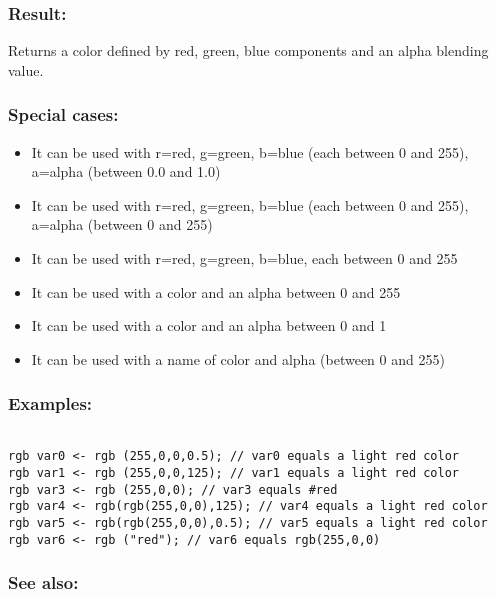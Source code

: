 \documentclass[]{book}
\providecommand{\tightlist}{%
  \setlength{\itemsep}{0pt}\setlength{\parskip}{0pt}}
\theoremstyle{definition}
\theoremstyle{definition}
\theoremstyle{definition}
\theoremstyle{remark}
\begin{document}
\subsubsection{Result:}\label{result-423}

Returns a color defined by red, green, blue components and an alpha
blending value.

\subsubsection{Special cases:}\label{special-cases-118}

\begin{itemize}
\tightlist
\item
  It can be used with r=red, g=green, b=blue (each between 0 and 255),
  a=alpha (between 0.0 and 1.0)\\
\item
  It can be used with r=red, g=green, b=blue (each between 0 and 255),
  a=alpha (between 0 and 255)\\
\item
  It can be used with r=red, g=green, b=blue, each between 0 and 255\\
\item
  It can be used with a color and an alpha between 0 and 255\\
\item
  It can be used with a color and an alpha between 0 and 1\\
\item
  It can be used with a name of color and alpha (between 0 and 255)
\end{itemize}

\subsubsection{Examples:}\label{examples-300}

\begin{verbatim}
 
rgb var0 <- rgb (255,0,0,0.5); // var0 equals a light red color 
rgb var1 <- rgb (255,0,0,125); // var1 equals a light red color 
rgb var3 <- rgb (255,0,0); // var3 equals #red 
rgb var4 <- rgb(rgb(255,0,0),125); // var4 equals a light red color 
rgb var5 <- rgb(rgb(255,0,0),0.5); // var5 equals a light red color 
rgb var6 <- rgb ("red"); // var6 equals rgb(255,0,0)
\end{verbatim}

\subsubsection{See also:}\label{see-also-175}
\end{document}
